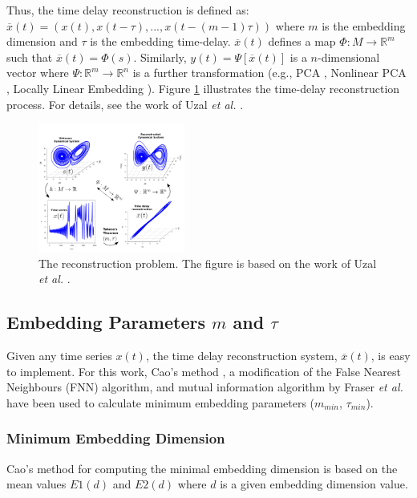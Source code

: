 \documentclass[10pt,journal,compsoc]{IEEEtran}
\begin{document}
Thus, the time delay reconstruction is defined as:
$\overline{x}(t) = (x(t), x(t-\tau),...,x(t-(m-1)\tau))$ 
where $m$ is the embedding dimension and $\tau$ is the embedding time-delay.
$\overline{x}(t)$ defines a map $\varPhi: M \rightarrow \mathbb{R}^m$ such that 
$\overline{x}(t) = \varPhi(s)$.
Similarly, $y(t)= \varPsi [\overline{x}(t)]$ is a $n$-dimensional vector 
where $\varPsi: \mathbb{R}^m \rightarrow \mathbb{R}^n$ is a further transformation 
(e.g., PCA \cite{Shlens2014}, Nonlinear PCA \cite{Kruger2007}, 
Locally Linear Embedding \cite{Roweis2000}). Figure \ref{fig:takens_theorem} 
illustrates the time-delay reconstruction process. For details, 
see the work of Uzal \textit{et al.} \cite{Uzal2011}.
\begin{figure}[!htb]
\centering    
 \includegraphics[width=0.43\textwidth]{takens_theorem_v6}
\caption[PA]{The reconstruction problem. The figure is based on the work of Uzal 
\textit{et al.} \cite{Uzal2011}.}
\label{fig:takens_theorem}
\end{figure}

\subsection{Embedding Parameters $m$ and $\tau$}
Given any time series $x(t)$, the time delay reconstruction 
system, $\overline{x}(t)$, is easy to implement. For this work, Cao's 
method \cite{Cao1997}, a modification of the False Nearest Neighbours 
(FNN) algorithm, and mutual information algorithm by 
Fraser \textit{et al.} \cite{Fraser1986} have been used to calculate minimum 
embedding parameters ($m_{min}$, $\tau_{min}$).


\subsubsection{Minimum Embedding Dimension}
Cao's method \cite{Cao1997} for computing the minimal embedding 
dimension is based on the mean values $E1(d)$ and $E2(d)$ 
where $d$ is a given embedding dimension value.
\end{document}
